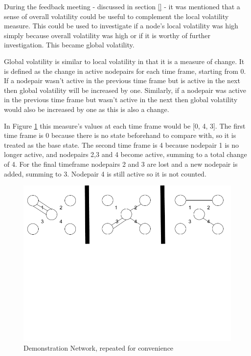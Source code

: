 During the feedback meeting - discussed in section \ref{} - it was mentioned that a sense of overall volatility could be useful to complement the local volatility measure. This could be used to investigate if a node's local volatility was high simply because overall volatility was high or if it is worthy of further investigation. This became global volatility.

Global volatility is similar to local volatility in that it is a measure of change. It is defined as the change in active nodepairs for each time frame, starting from 0. If a nodepair wasn't active in the previous time frame but is active in the next then global volatility will be increased by one. Similarly, if a nodepair was active in the previous time frame but wasn't active in the next then global volatility would also be increased by one as this is also a change. 

In Figure \ref{fig:demonstrationNetwork2} this measure's values at each time frame would be [0, 4, 3]. The first time frame is 0 because there is no state beforehand to compare with, so it is treated as the base state. The second time frame is 4 because nodepair 1 is no longer active, and nodepairs 2,3 and 4 become active, summing to a total change of 4. For the final timeframe nodepairs 2 and 3 are lost and a new nodepair is added, summing to 3. Nodepair 4 is still active so it is not counted.

\begin{figure}[h!]
  \begin{center}
  \includegraphics[trim={0 11cm 0 0}, clip, width=140mm]{./Figures/globalMeasuresReferenceNetwork.png}
  \end{center}
  \caption{Demonstration Network, repeated for convenience}
  \label{fig:demonstrationNetwork2}
\end{figure}


